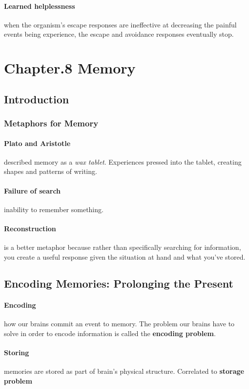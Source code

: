 \documentclass{article}
\begin{document}
	\paragraph{Learned helplessness} when the organism's escape responses are ineffective at decreasing the painful events being experience, the escape and avoidance responses eventually stop.

	\section{Chapter.8 Memory}
	\subsection{Introduction}
	\subsubsection{Metaphors for Memory}
	\paragraph{Plato and Aristotle} described memory as a \emph{wax tablet}. Experiences pressed into the tablet, creating shapes and patterns of writing. 
	\paragraph{Failure of search} inability to remember something.
	\paragraph{Reconstruction} is a better metaphor because rather than specifically searching for information, you create a useful response given the situation at hand and what you've stored.

	\subsection{Encoding Memories: Prolonging the Present}
	\paragraph{Encoding} how our brains commit an event to memory. The problem our brains have to solve in order to encode information is called the \textbf{encoding problem}.
	\paragraph{Storing} memories are stored as part of brain's physical structure. Correlated to \textbf{storage problem}
\end{document}
